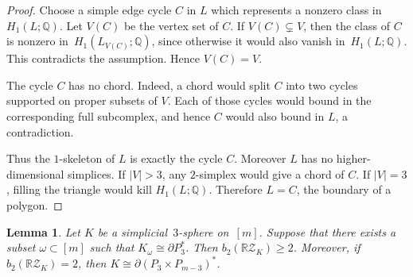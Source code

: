 \documentclass{amsart}
\newtheorem{lemma}[theorem]{Lemma}
\numberwithin{equation}{section}
\theoremstyle{definition}
\theoremstyle{remark}
\newcommand{\Q}{\mathbb Q}
\newcommand{\RZ}{\mathbb R\mathcal Z}
\begin{document}
\begin{proof}    
    Choose a simple edge cycle $C$ in $L$ which represents a nonzero class in~$H_1(L;\Q)$.
    Let $V(C)$ be the vertex set of $C$.
    If $V(C)\subsetneq V$, then the class of $C$ is nonzero in~$H_1(L_{V(C)};\Q)$, since otherwise it would also vanish in~$H_1(L;\Q)$.
    This contradicts the assumption. 
    Hence $V(C)=V$.

    The cycle $C$ has no chord.
    Indeed, a chord would split $C$ into two cycles supported on proper subsets of $V$.
    Each of those cycles would bound in the corresponding full subcomplex, and hence $C$ would also bound in $L$, a contradiction.
    
    Thus the $1$-skeleton of $L$ is exactly the cycle $C$. 
    Moreover $L$ has no higher-dimensional simplices. 
    If $|V|>3$, any $2$-simplex would give a chord of $C$.
    If $|V|=3$, filling the triangle would kill $H_1(L;\Q)$.
    Therefore $L=C$, the boundary of a polygon.
\end{proof}

\begin{lemma} \label{lem:missing_triangle}
    Let $K$ be a simplicial~$3$-sphere on~$[m]$.
    Suppose that there exists a subset $\omega\subset [m]$ such that $K_\omega \cong \partial P_3^\ast$.
    Then $b_2(\RZ_K)\ge 2$.
    Moreover, if $b_2(\RZ_K)=2$, then $K \cong \partial (P_3 \times P_{m-3})^\ast$.
\end{lemma}
\end{document}

